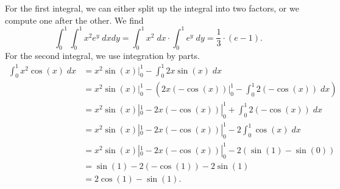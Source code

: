 \documentclass[11pt]{article}
\begin{document}
\begin{solution}
    For the first integral, we can either split up the integral into two factors, or we compute one after the other.
    We find 
    \[
        \int_0^1 \int_0^1 x^2 e^y \; dx dy
        =
        \int_0^1 x^2 \; dx 
        \cdot 
        \int_0^1 e^y \; dy
        =
        \frac 1 3 \cdot ( e - 1).
    \]
    For the second integral, we use integration by parts. 
    \begin{align*}
        \int_0^1 x^2 \cos(x) \; dx
        &=
        x^2 \sin(x) |_0^1
        -
        \int_0^1 2x \sin(x) \; dx
        \\&=
        x^2 \sin(x) |_0^1
        -
        \left( 2x (-\cos(x)) |_0^1 - \int_0^1 2 (-\cos(x)) \; dx \right)
        \\&=
        x^2 \sin(x) |_0^1
        -
        2x (-\cos(x)) |_0^1 
        +
        \int_0^1 2 (-\cos(x)) \; dx
        \\&=
        x^2 \sin(x) |_0^1
        -
        2x (-\cos(x)) |_0^1 
        -
        2 \int_0^1 \cos(x) \; dx
        \\&=
        x^2 \sin(x) |_0^1
        -
        2x (-\cos(x)) |_0^1 
        -
        2 \left( \sin(1) - \sin(0) \right)
        \\&=
        \sin(1)
        -
        2 (-\cos(1)) 
        -
        2 \sin(1)
        \\&=
        2 \cos(1)
        - 
        \sin(1)
        .
    \end{align*}
\end{solution}
\end{document}
